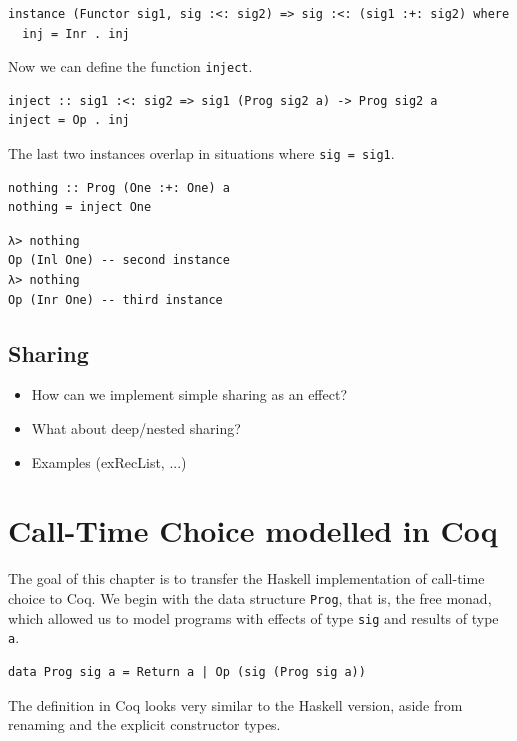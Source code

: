 \documentclass[a4paper, 11pt, fleqn, twoside]{scrreprt}
\newcommand{\todo}[1]{\marginpar{\textbf{TODO:} #1}}
\newcommand{\hinl}[1]{\texttt{#1}}
\begin{document}
\begin{verbatim}
instance (Functor sig1, sig :<: sig2) => sig :<: (sig1 :+: sig2) where
  inj = Inr . inj
\end{verbatim}

Now we can define the function \hinl{inject}. \todo{Finish this}

\begin{verbatim}
inject :: sig1 :<: sig2 => sig1 (Prog sig2 a) -> Prog sig2 a
inject = Op . inj
\end{verbatim}

The last two instances overlap in situations where \hinl{sig = sig1}.

\begin{verbatim}
nothing :: Prog (One :+: One) a
nothing = inject One
\end{verbatim}

\begin{verbatim}
λ> nothing
Op (Inl One) -- second instance
λ> nothing
Op (Inr One) -- third instance
\end{verbatim}

\section{Sharing}
\begin{itemize}
\item How can we implement simple sharing as an effect?
\item What about deep/nested sharing?
\item Examples (exRecList, ...)
\end{itemize}


\chapter{Call-Time Choice modelled in Coq}
\label{ch:callTimeChoiceCoq}
The goal of this chapter is to transfer the Haskell implementation of call-time 
choice to Coq. We begin with the data structure \hinl{Prog}, 
that is, the free monad, which allowed us to model programs with effects of 
type \hinl{sig} and results of type \hinl{a}.

\begin{verbatim}
data Prog sig a = Return a | Op (sig (Prog sig a))
\end{verbatim}

The definition in Coq looks very similar to the Haskell version, aside from 
renaming and the explicit constructor types.
\end{document}
